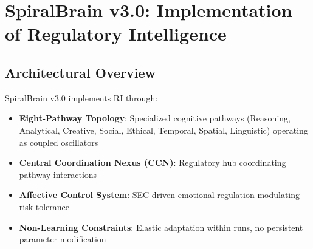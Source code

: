 \documentclass[12pt,a4paper]{report}
\begin{document}
\section{SpiralBrain v3.0: Implementation of Regulatory Intelligence}

\subsection{Architectural Overview}

SpiralBrain v3.0 implements RI through:
\begin{itemize}
    \item \textbf{Eight-Pathway Topology}: Specialized cognitive pathways (Reasoning, Analytical, Creative, Social, Ethical, Temporal, Spatial, Linguistic) operating as coupled oscillators
    \item \textbf{Central Coordination Nexus (CCN)}: Regulatory hub coordinating pathway interactions
    \item \textbf{Affective Control System}: SEC-driven emotional regulation modulating risk tolerance
    \item \textbf{Non-Learning Constraints}: Elastic adaptation within runs, no persistent parameter modification
\end{itemize}
\end{document}
